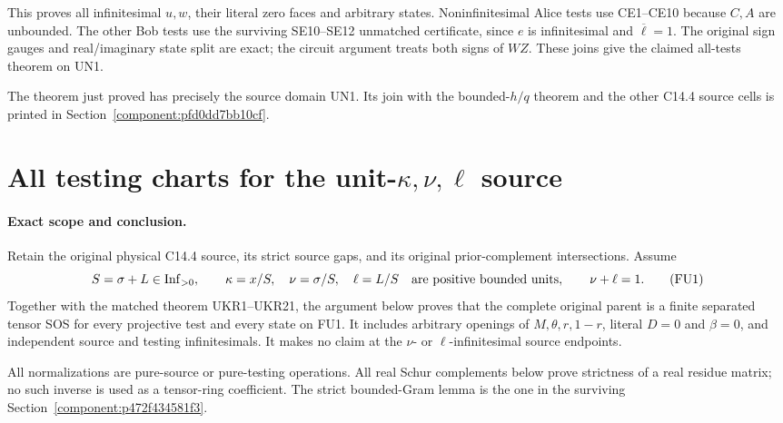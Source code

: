 This proves all infinitesimal $u,w$, their literal zero faces and
arbitrary states. Noninfinitesimal Alice tests use CE1--CE10 because
$C,A$ are unbounded. The other Bob tests use the surviving SE10--SE12
unmatched certificate, since $e$ is infinitesimal and
$\overline\ell=1$. The original sign gauges and real/imaginary state
split are exact; the circuit argument treats both signs of $WZ$.
These joins give the claimed all-tests theorem on UN1.

The theorem just proved has precisely the source domain UN1. Its join with the bounded-$h/q$ theorem and the other C14.4 source cells is printed in Section~\ref{component:pfd0dd7bb10cf}.


\section{\texorpdfstring{All testing charts for the unit-$\kappa,\nu,\ell$ source}{All testing charts for the unit-kappa,nu,ell source}}
\label{component:p3f02c51074be}

\label{p3f02c51074be:sec:new-c144-unit-kappa-all-tests}

\paragraph{Exact scope and conclusion.}
Retain the original physical C14.4 source, its strict source gaps,
and its original prior-complement intersections. Assume
\[
 S=\sigma+L\in\operatorname{Inf}_{>0},\qquad
 \kappa=x/S,\quad\nu=\sigma/S,\quad\ell=L/S
 \quad\hbox{are positive bounded units},\qquad\nu+\ell=1.
 \tag{FU1}
\]
Together with the matched theorem UKR1--UKR21, the argument below
proves that the complete original parent is a finite separated tensor
SOS for every projective test and every state on FU1. It includes
arbitrary openings of $M,\theta,r,1-r$, literal $D=0$ and $\beta=0$,
and independent source and testing infinitesimals. It makes no claim
at the $\nu$- or $\ell$-infinitesimal source endpoints.

All normalizations are pure-source or pure-testing operations.
All real Schur complements below prove strictness of a real residue
matrix; no such inverse is used as a tensor-ring coefficient. The
strict bounded-Gram lemma is the one in the surviving
Section~\ref{component:p472f434581f3}.

